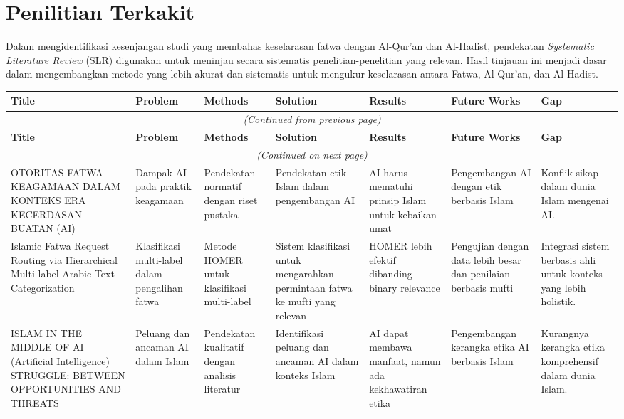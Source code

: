 \documentclass[12pt,a4paper]{article}
\begin{document}
\section{Penilitian Terkakit}

Dalam mengidentifikasi kesenjangan studi yang membahas keselarasan fatwa dengan Al-Qur’an dan Al-Hadist, pendekatan \textit{Systematic Literature Review} (SLR) digunakan untuk meninjau secara sistematis penelitian-penelitian yang relevan. Hasil tinjauan ini menjadi dasar dalam mengembangkan metode yang lebih akurat dan sistematis untuk mengukur keselarasan antara Fatwa, Al-Qur’an, dan Al-Hadist.

\begin{longtable}{|p{2cm}|p{2cm}|p{2cm}|p{2cm}|p{2cm}|p{2.5cm}|p{2.5cm}|}
\hline
\textbf{Title} & \textbf{Problem} & \textbf{Methods} & \textbf{Solution} & \textbf{Results} & \textbf{Future Works} & \textbf{Gap} \\ \hline\hline
\endfirsthead
\multicolumn{7}{c}{\textit{(Continued from previous page)}} \\ \hline
\textbf{Title} & \textbf{Problem} & \textbf{Methods} & \textbf{Solution} & \textbf{Results} & \textbf{Future Works} & \textbf{Gap} \\ \hline
\endhead
\multicolumn{7}{c}{\textit{(Continued on next page)}} \\ \hline
\endfoot
\endlastfoot

OTORITAS FATWA KEAGAMAAN DALAM KONTEKS ERA KECERDASAN BUATAN (AI) & Dampak AI pada praktik keagamaan & Pendekatan normatif dengan riset pustaka & Pendekatan etik Islam dalam pengembangan AI & AI harus mematuhi prinsip Islam untuk kebaikan umat & Pengembangan AI dengan etik berbasis Islam & Konflik sikap dalam dunia Islam mengenai AI. \\ \hline

Islamic Fatwa Request Routing via Hierarchical Multi-label Arabic Text Categorization & Klasifikasi multi-label dalam pengalihan fatwa & Metode HOMER untuk klasifikasi multi-label & Sistem klasifikasi untuk mengarahkan permintaan fatwa ke mufti yang relevan & HOMER lebih efektif dibanding binary relevance & Pengujian dengan data lebih besar dan penilaian berbasis mufti & Integrasi sistem berbasis ahli untuk konteks yang lebih holistik. \\ \hline

ISLAM IN THE MIDDLE OF AI (Artificial Intelligence) STRUGGLE: BETWEEN OPPORTUNITIES AND THREATS & Peluang dan ancaman AI dalam Islam & Pendekatan kualitatif dengan analisis literatur & Identifikasi peluang dan ancaman AI dalam konteks Islam & AI dapat membawa manfaat, namun ada kekhawatiran etika & Pengembangan kerangka etika AI berbasis Islam & Kurangnya kerangka etika komprehensif dalam dunia Islam. \\ \hline


\end{longtable}
\end{document}
